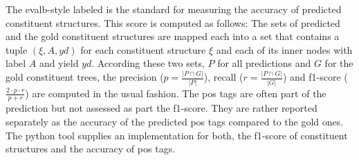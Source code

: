\documentclass[../document.tex]{subfiles}
\begin{document}
    The evalb-style labeled \cite{black} is the standard for measuring the accuracy of predicted constituent structures.
    This score is computed as follows:
        The sets of predicted and the gold constituent structures are mapped each into a set that contains a tuple \((\xi, A, \mathit{yd})\) for each constituent structure \(\xi\) and each of its inner nodes with label \(A\) and yield \(\mathit{yd}\).
        According these two sets, \(P\) for all predictions and \(G\) for the gold constituent trees, the precision (\(p = \frac{|P \cap G|}{|P|}\)), recall (\(r = \frac{|P \cap G|}{|G|}\)) and f1-score (\(\frac{2\cdot p\cdot r}{p + r}\)) are computed in the usual fashion.
    The \gls*{pos} tags are often part of the prediction but not assessed as part the f1-score.
    They are rather reported separately as the accuracy of the predicted \gls*{pos} tags compared to the gold ones.
    The python tool  supplies an implementation for both, the f1-score of constituent structures and the accuracy of \gls*{pos} tags. \citep{CraSchBod16}
\end{document}
